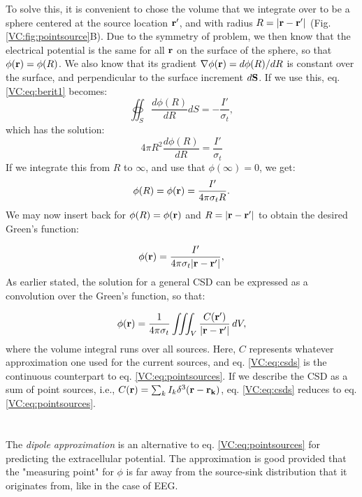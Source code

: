 To solve this, it is convenient to chose the volume that we integrate over to be a sphere centered at the source location ${\bf r'}$, and with radius $R = |{\bf r-r'}|$ (Fig. \ref{VC:fig:pointsource}B). Due to the symmetry of problem, we then know that the electrical potential is the same for all ${\bf r}$ on the surface of the sphere, so that $\phi({\bf r}) = \phi(R)$. We also know that its gradient $\nabla\phi({\bf r}) = d\phi(R)/dR$ is constant over the surface, and perpendicular to the surface increment $d{\bf S}$. If we use this, eq. \ref{VC:eq:berit1} becomes:
\begin{equation}
\oiint_{S} \frac{d\phi(R)}{dR} d{S}  = - \frac{I'}{\sigma_t},
\label{VC:eq:berit1ogenhalv}
\end{equation}
which has the solution:
\begin{equation}
4\pi R^2 \frac{d\phi(R)}{dR} = \frac{I'}{\sigma_t}
\label{VC:eq:berit2}
\end{equation}
If we integrate this from $R$ to $\infty$, and use that $\phi(\infty) = 0$, we get:
\begin{equation}
\phi(R) = \phi({\bf r}) = \frac{I'}{4\pi \sigma_t R}.
\label{VC:eq:berit3}
\end{equation}
We may now insert back for $\phi(R)= \phi({\bf r})$ and $R = |{\bf r-r'}|$ to obtain the desired Green's function:

\begin{equation}
\phi({\bf r})= \frac{I'}{4\pi \sigma_t |{\bf r-r'}|},
\label{VC:eq:berit4}
\end{equation}
As earlier stated, the solution for a general CSD can be expressed as a convolution over the Green's function, so that:

\begin{equation}
\phi({\bf r}) = \frac{1}{4\pi \sigma_t}\iiint_V \frac{C({\bf r'})}{|{\bf r}-{\bf r'}|} \,dV, 
\label{VC:eq:csds}
\end{equation}
where the volume integral runs over all sources. Here, $C$ represents whatever approximation one used for the current sources, and eq. \ref{VC:eq:csds} is the continuous counterpart to eq. \ref{VC:eq:pointsources}. If we describe the CSD as a sum of point sources, i.e.,  $C({\bf r}) = \sum_k I_k \delta^3({\bf r} - {\bf r_k})$, eq. \ref{VC:eq:csds} reduces to eq.\ref{VC:eq:pointsources}.


\section{}
\label{sec:VC:dipole}
The \textit{dipole approximation}  is an alternative to eq. \ref{VC:eq:pointsources} for predicting the extracellular potential. The approximation is good provided that the "measuring point" for $\phi$ is far away from the source-sink distribution that it originates from, like in the case of EEG.

